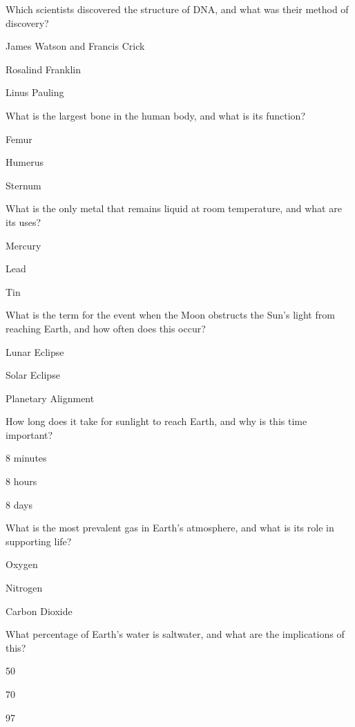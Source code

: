 \begin{enhancedmcq}{Which scientists discovered the structure of DNA, and what was their method of discovery?}
\item James Watson and Francis Crick
\item Rosalind Franklin
\item Linus Pauling

\end{enhancedmcq}
\begin{enhancedmcq}{What is the largest bone in the human body, and what is its function?}
\item Femur
\item Humerus
\item Sternum

\end{enhancedmcq}
\begin{enhancedmcq}{What is the only metal that remains liquid at room temperature, and what are its uses?}
\item Mercury
\item Lead
\item Tin

\end{enhancedmcq}
\begin{enhancedmcq}{What is the term for the event when the Moon obstructs the Sun's light from reaching Earth, and how often does this occur?}
\item Lunar Eclipse
\item Solar Eclipse
\item Planetary Alignment

\end{enhancedmcq}
\begin{enhancedmcq}{How long does it take for sunlight to reach Earth, and why is this time important?}
\item 8 minutes
\item 8 hours
\item 8 days

\end{enhancedmcq}
\begin{enhancedmcq}{What is the most prevalent gas in Earth's atmosphere, and what is its role in supporting life?}
\item Oxygen
\item Nitrogen
\item Carbon Dioxide

\end{enhancedmcq}
\begin{enhancedmcq}{What percentage of Earth's water is saltwater, and what are the implications of this?}
\item 50%
\item 70%
\item 97%

\end{enhancedmcq}
